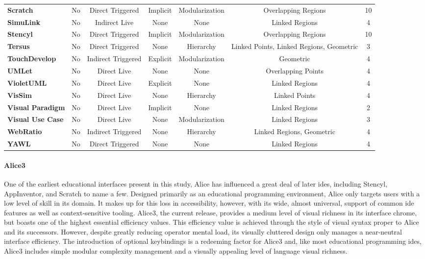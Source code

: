 \begin{table*}
{\begin{tabular}{l|ccc|ccc}
      \textbf{Scratch}    & No	& Direct Triggered	& Implicit	& Modularization	& Overlapping Regions	& 10			\\[1ex]
      \textbf{SimuLink}    & No	& Indirect Live	& None	& None	& Linked Regions	& 4			\\[1ex]
      \textbf{Stencyl}    & No	& Direct Triggered	& Implicit	& Modularization	& Overlapping Regions	& 10			\\[1ex]
      \textbf{Tersus}    & No	& Direct Triggered	& None	& Hierarchy	& Linked Points, Linked Regions, Geometric	& 3			\\[1ex]
      \textbf{TouchDevelop}    & No	& Indirect Triggered	& Explicit	& Modularization	& Geometric	& 4			\\[1ex]
      \textbf{UMLet}    & No	& Direct Live	& None	& None	& Overlapping Points	& 4			\\[1ex]
      \textbf{VioletUML}    & No	& Direct Live	& Explicit	& None	& Linked Regions	& 4			\\[1ex]
      \textbf{VisSim}    & No	& Direct Live	& None	& Hierarchy	& Linked Points	& 4			\\[1ex]
      \textbf{Visual Paradigm}    & No	& Direct Live	& Implicit	& None	& Linked Regions	& 2			\\[1ex]
      \textbf{Visual Use Case}    & No	& Direct Live	& None	& Modularization	& Linked Regions	& 3			\\[1ex]
      \textbf{WebRatio}    & No	& Indirect Triggered	& None	& Hierarchy	& Linked Regions, Geometric	& 4			\\[1ex]
      \textbf{YAWL}    & No	& Direct Triggered	& None	& None	& Linked Regions	& 4			\\[1ex]
		\end{tabular}}
	\caption{Measure of the integration and language syntax of \acp{ide}.}
	\label{tab:integration-langsyn}
\end{table*}
%
\paragraph{Alice3} One of the earliest educational interfaces present in
this study, Alice has influenced a great deal of later \acp{ide}, including
Stencyl, AppInventor, and Scratch to name a few. Designed primarily as an
educational programming environment, Alice only targets users with a low
level of skill in its domain. It makes up for this loss in accessibility,
however, with its wide, almost universal, support of common \ac{ide}
features as well as context-sensitive tooling. Alice3, the current release,
provides a medium level of visual richness in its interface chrome, but
boasts one of the highest essential efficiency values. This efficiency
value is achieved through the style of visual syntax proper to Alice and
its successors. However, despite greatly reducing operator mental load,
its visually cluttered design only manages a near-neutral interface
efficiency. The introduction of optional keybindings is a redeeming factor
for Alice3 and, like most educational programming \acp{ide}, Alice3
includes simple modular complexity management and a visually appealing
level of language visual richness.

